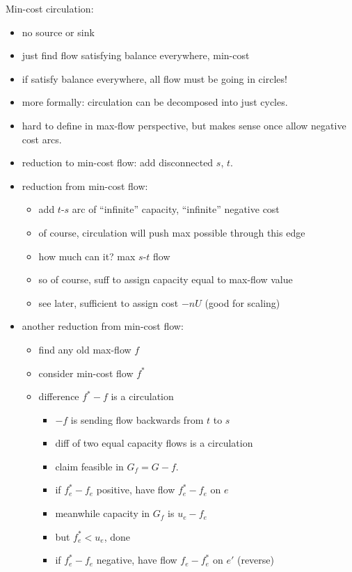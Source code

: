 \documentclass{article}
\begin{document}
  Min-cost circulation:
  \begin{itemize}
  \item no source or sink
  \item just find flow satisfying balance everywhere, min-cost
  \item if satisfy balance everywhere, all flow must be going in
    circles!
  \item more formally: circulation can be decomposed into just cycles.
  \item hard to define in max-flow perspective, but makes sense once allow
    negative cost arcs.
  \item reduction to min-cost flow: add disconnected $s$, $t$.
  \item reduction from min-cost flow:
    \begin{itemize}
    \item add $t$-$s$ arc of ``infinite'' capacity, ``infinite'' negative
      cost
    \item of course, circulation will push max possible through this edge
    \item how much can it?  max $s$-$t$ flow
    \item so of course, suff to assign capacity equal to max-flow value
    \item see later, sufficient to assign cost $-nU$ (good for scaling)
    \end{itemize}
  \item another reduction from min-cost flow:
    \begin{itemize}
    \item find any old max-flow $f$
    \item consider min-cost flow $f^*$
    \item difference $f^*-f$ is a circulation
      \begin{itemize}
        \item $-f$ is sending flow backwards from $t$ to $s$
        \item diff of two equal    capacity flows is a circulation
      \end{itemize}
\begin{itemize}
    \item claim feasible in $G_f = G-f$.  
    \item if $f^*_e-f_e$ positive, have flow $f^*_e-f_e$ on $e$
    \item meanwhile capacity in $G_f$ is $u_e-f_e$
    \item but $f^*_e<u_e$, done
    \item if $f^*_e-f_e$ negative, have flow $f_e-f^*_e$ on $e'$ (reverse)

\end{itemize}
\end{itemize}
\end{itemize}
\end{document}
